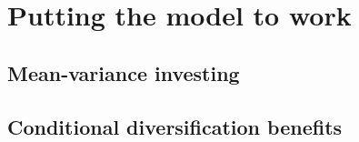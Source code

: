 %

\section{Putting the model to work}

\subsection{Mean-variance investing}

\subsection{Conditional diversification benefits}
